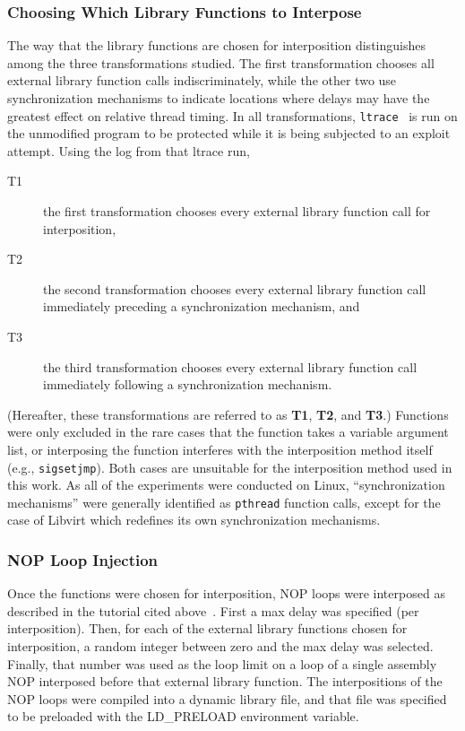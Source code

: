 \subsubsection{Choosing Which Library Functions to Interpose}\label{choosing}
The way that the library functions are chosen for interposition distinguishes among the three transformations studied.
The first transformation chooses all external library function calls indiscriminately, while the other two use synchronization mechanisms to indicate locations where delays may have the greatest effect on relative thread timing.
In all transformations, \texttt{ltrace}~\cite{cespedesltrace} is run on the unmodified program to be protected while it is being subjected to an exploit attempt.
Using the log from that ltrace run,
\begin{description}
	\item[T1] the first transformation chooses every external library function call for interposition,
	\item[T2] the second transformation chooses every external library function call immediately preceding a synchronization mechanism, and
	\item[T3] the third transformation chooses every external library function call immediately following a synchronization mechanism.
\end{description}
(Hereafter, these transformations are referred to as \textbf{T1}, \textbf{T2}, and \textbf{T3}.)
Functions were only excluded in the rare cases that the function takes a
variable argument list, or interposing the function interferes with the
interposition method itself (e.g., \texttt{sigsetjmp}).
Both cases are unsuitable for the interposition method used in this work.
As all of the experiments were conducted on Linux, ``synchronization
mechanisms'' were generally identified as \texttt{pthread} function calls, except for the case of Libvirt which redefines its own synchronization mechanisms.
\subsubsection{NOP Loop Injection}
Once the functions were chosen for interposition, NOP loops were interposed as described in the tutorial cited above~\cite{Conrod2009}.
First a max delay was specified (per interposition).
Then, for each of the external library functions chosen for interposition, a random integer between zero and the max delay was selected.
Finally, that number was used as the loop limit on a loop of a single assembly NOP interposed before that external library function.
The interpositions of the NOP loops were compiled into a dynamic library file, and that file was specified to be preloaded with the LD\_PRELOAD environment variable.

